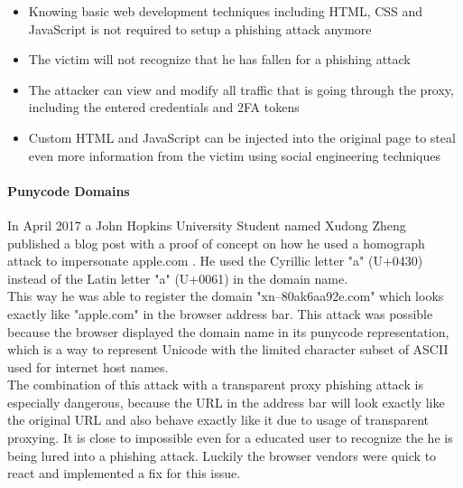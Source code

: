 \documentclass[12pt]{scrbook}
\begin{document}
\begin{itemize}
	\item Knowing basic web development techniques including HTML,
	      CSS and JavaScript is not required to setup a phishing attack anymore
	\item The victim will not recognize that he has fallen for a phishing attack
	\item The attacker can view and modify all traffic that is going through the
	      proxy, including the entered credentials and 2FA tokens
	\item Custom HTML and JavaScript can be injected into the original page to
	      steal even more information from the victim using social engineering
	      techniques
\end{itemize}

\paragraph{Punycode Domains}
In April 2017 a John Hopkins University Student named Xudong Zheng published a
blog post with a proof of concept on how he used a homograph attack to
impersonate apple.com \cite{punycodePhishing}. He used the Cyrillic letter "a" (U+0430) instead of the
Latin letter "a" (U+0061) in the domain name.\\This way he was able to register
the domain "xn--80ak6aa92e.com" which looks exactly like "apple.com" in the
browser address bar. This attack was possible because the browser displayed the
domain name in its punycode representation, which is a way to represent Unicode
with the limited character subset of ASCII used for internet host names.\\ The
combination of this attack with a transparent proxy phishing attack is
especially dangerous, because the URL in the address bar will look exactly like
the original URL and also behave exactly like it due to usage of transparent
proxying. It is close to impossible even for a educated user to recognize the he
is being lured into a phishing attack. Luckily the browser vendors were quick to
react and implemented a fix for this issue.
\end{document}
